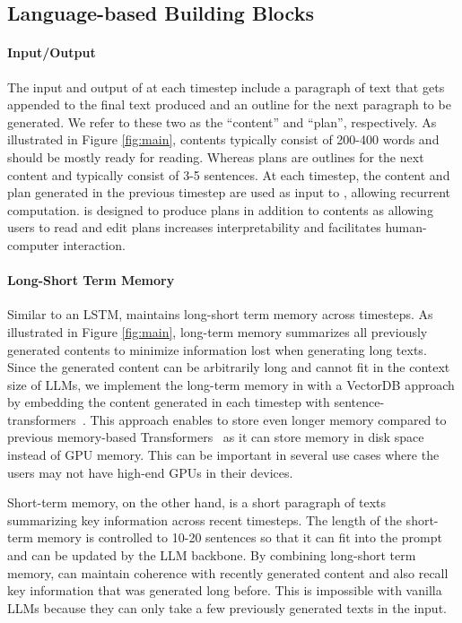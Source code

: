 \subsection{Language-based Building Blocks}

\paragraph{Input/Output} The input and output of \baby at each timestep include a paragraph of text that gets appended to the final text produced and an outline for the next paragraph to be generated. We refer to these two as the ``content'' and ``plan'', respectively. As illustrated in Figure \ref{fig:main}, contents typically consist of 200-400 words and should be mostly ready for reading. Whereas plans are outlines for the next content and typically consist of 3-5 sentences. At each timestep, the content and plan generated in the previous timestep are used as input to \baby, allowing recurrent computation. \baby is designed to produce plans in addition to contents as allowing users to read and edit plans increases interpretability and facilitates human-computer interaction.

\paragraph{Long-Short Term Memory} Similar to an LSTM, \baby maintains long-short term memory across timesteps. As illustrated in Figure \ref{fig:main}, long-term memory summarizes all previously generated contents to minimize information lost when generating long texts. Since the generated content can be arbitrarily long and cannot fit in the context size of LLMs, we implement the long-term memory in \baby with a VectorDB approach by embedding the content generated in each timestep with sentence-transformers~\citep{reimers-2019-sentence-bert}. This approach enables \baby to store even longer memory compared to previous memory-based Transformers~\citep{dai*2019transformerxl,bulatov2022recurrent} as it can store memory in disk space instead of GPU memory. This can be important in several use cases where the users may not have high-end GPUs in their devices.

Short-term memory, on the other hand, is a short paragraph of texts summarizing key information across recent timesteps. The length of the short-term memory is controlled to 10-20 sentences so that it can fit into the prompt and can be updated by the LLM backbone. By combining long-short term memory, \baby can maintain coherence with recently generated content and also recall key information that was generated long before. This is impossible with vanilla LLMs because they can only take a few previously generated texts in the input.


